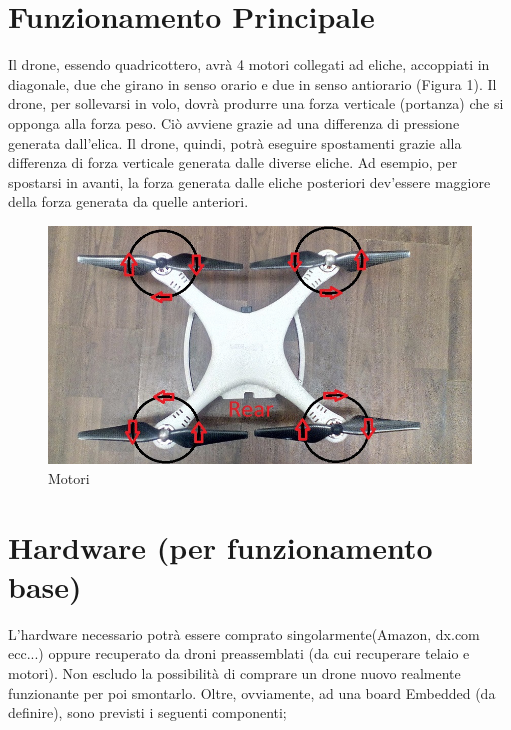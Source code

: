 \documentclass[]{article}
\begin{document}
\section{Funzionamento Principale}
Il drone, essendo quadricottero, avrà 4 motori collegati ad eliche, accoppiati in diagonale, due che girano in senso orario e due in senso antiorario (Figura 1). Il drone, per sollevarsi in volo, dovrà produrre una forza verticale (portanza) che si opponga alla forza peso. Ciò avviene grazie ad una differenza di pressione generata dall'elica. Il drone, quindi, potrà eseguire spostamenti grazie alla differenza di forza verticale generata dalle diverse eliche. Ad esempio, per spostarsi in avanti, la forza generata dalle eliche posteriori dev'essere maggiore della forza generata da quelle anteriori.
\begin{figure}[!htpb]
\centering
\includegraphics[scale=0.3]{figura1.jpg}
\caption{Motori}
\label{figura1}
\end{figure}
\section{Hardware (per funzionamento base)}
L'hardware necessario potrà essere comprato singolarmente(Amazon, dx.com ecc...) oppure recuperato da droni preassemblati (da cui recuperare telaio e motori). Non escludo la possibilità di comprare un drone nuovo realmente funzionante per poi smontarlo.
Oltre, ovviamente, ad una board Embedded (da definire), sono previsti i seguenti componenti;
\end{document}

